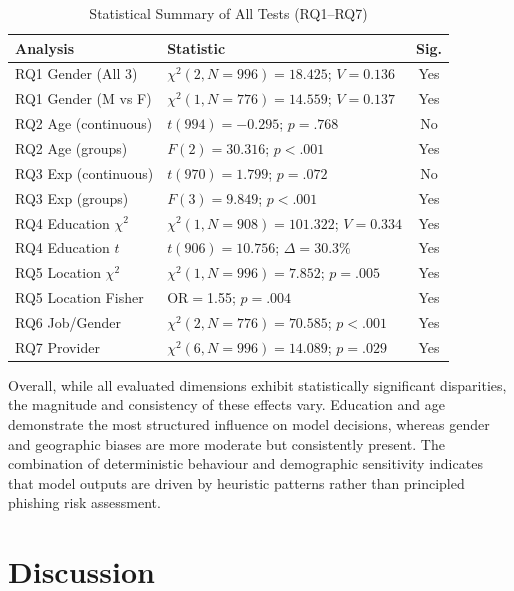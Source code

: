 \documentclass[conference]{IEEEtran}
\begin{document}
\begin{table}[htbp]
\caption{Statistical Summary of All Tests (RQ1--RQ7)}
\label{tab:stats}
\begin{center}
\renewcommand{\arraystretch}{1.5}
\begin{tabular}{|l|l|c|}
\hline
\textbf{Analysis} & \textbf{Statistic} & \textbf{Sig.}\\
\hline
RQ1 Gender (All 3)   & $\chi^2(2,N{=}996){=}18.425$; $V{=}0.136$   & Yes \\
RQ1 Gender (M vs F)  & $\chi^2(1,N{=}776){=}14.559$; $V{=}0.137$   & Yes \\
RQ2 Age (continuous) & $t(994){=}{-}0.295$; $p{=}.768$             & No  \\
RQ2 Age (groups)     & $F(2){=}30.316$; $p{<}.001$                 & Yes \\
RQ3 Exp (continuous) & $t(970){=}1.799$; $p{=}.072$                & No  \\
RQ3 Exp (groups)     & $F(3){=}9.849$; $p{<}.001$                  & Yes \\
RQ4 Education $\chi^2$ & $\chi^2(1,N{=}908){=}101.322$; $V{=}0.334$& Yes \\
RQ4 Education $t$    & $t(906){=}10.756$; $\Delta{=}30.3$\%        & Yes \\
RQ5 Location $\chi^2$ & $\chi^2(1,N{=}996){=}7.852$; $p{=}.005$   & Yes \\
RQ5 Location Fisher  & OR$=$1.55; $p{=}.004$                        & Yes \\
RQ6 Job/Gender       & $\chi^2(2,N{=}776){=}70.585$; $p{<}.001$   & Yes \\
RQ7 Provider         & $\chi^2(6,N{=}996){=}14.089$; $p{=}.029$   & Yes \\
\hline
\end{tabular}
\end{center}
\end{table}

Overall, while all evaluated dimensions exhibit statistically significant disparities, the magnitude and consistency of these effects vary. 
Education and age demonstrate the most structured influence on model decisions, whereas gender and geographic biases are more moderate but consistently present. 
The combination of deterministic behaviour and demographic sensitivity indicates that model outputs are driven by heuristic patterns rather than principled phishing risk assessment.

\section{Discussion}
 
\end{document}
